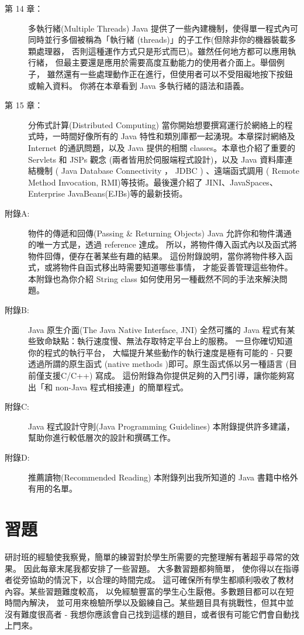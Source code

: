 \begin{description}
\item [第 14 章：] 多執行緒(Multiple Threads) 
Java 提供了一些內建機制，使得單一程式內可同時並行多個被稱為「執行緒
(threads)」的子工作(但除非你的機器裝載多顆處理器，
否則這種運作方式只是形式而已)。雖然任何地方都可以應用執行緒，
但最主要還是應用於需要高度互動能力的使用者介面上。舉個例子，
雖然還有一些處理動作正在進行，但使用者可以不受阻礙地按下按鈕或輸入資料。
你將在本章看到 Java 多執行緒的語法和語義。
\item [第 15 章：] 分佈式計算(Distributed Computing)
當你開始想要撰寫運行於網絡上的程式時，一時間好像所有的 Java
特性和類別庫都一起湧現。本章探討網絡及 Internet 的通訊問題，以及 Java
提供的相關 classes。本章也介紹了重要的 Servlets 和 JSPs 觀念
(兩者皆用於伺服端程式設計)，以及 Java 資料庫連結機制
( Java Database Connectivity ， JDBC ) 、遠端函式調用
( Remote Method Invocation, RMI)等技術。最後還介紹了 JINI、JavaSpaces、
Enterprise JavaBeans(EJBs)等的最新技術。
\item [附錄A:] 物件的傳遞和回傳(Passing \& Returning Objects) Java
允許你和物件溝通的唯一方式是，透過 reference 達成。
所以，將物件傳入函式內以及函式將物件回傳，便存在著某些有趣的結果。
這份附錄說明，當你將物件移入函式，或將物件自函式移出時需要知道哪些事情，
才能妥善管理這些物件。本附錄也為你介紹 String class
如何使用另一種截然不同的手法來解決問題。
\item [附錄B:] Java 原生介面(The Java Native Interface, JNI) 全然可攜的
Java 程式有某些致命缺點：執行速度慢、無法存取特定平台上的服務。
一旦你確切知道你的程式的執行平台，
大幅提升某些動作的執行速度是極有可能的 - 只要透過所謂的原生函式
(native methods )即可。原生函式係以另一種語言 (目前僅支援C/C++) 寫成。
這份附錄為你提供足夠的入門引導，讓你能夠寫出「和
non-Java 程式相接連」的簡單程式。
\item [附錄C:] Java 程式設計守則(Java Programming Guidelines)
本附錄提供許多建議，幫助你進行較低層次的設計和撰碼工作。
\item [附錄D:] 推薦讀物(Recommended Reading) 本附錄列出我所知道的
Java 書籍中格外有用的名單。
\end{description}


\section{習題}
研討班的經驗使我察覺，簡單的練習對於學生所需要的完整理解有著超乎尋常的效果。
因此每章末尾我都安排了一些習題。
大多數習題都夠簡單，
使你得以在指導者從旁協助的情況下，以合理的時間完成。
這可確保所有學生都順利吸收了教材內容。某些習題難度較高，
以免經驗豐富的學生心生厭倦。多數題目都可以在短時間內解決，
並可用來檢驗所學以及鍛練自己。某些題目具有挑戰性，但其中並沒有難度很高者 -
我想你應該會自己找到這樣的題目，或者很有可能它們會自動找上門來。

